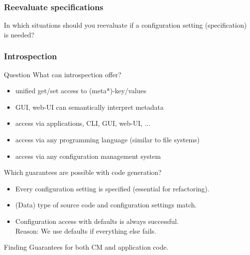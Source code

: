 \begin{frame}
	\frametitle{Reevaluate specifications}

	In which situations should you reevaluate if a configuration setting (specification) is needed?

	\pause

\end{frame}


\begin{frame}
	\frametitle{Introspection}
	\begin{alertblock}{Question}
	What can introspection offer?
	\end{alertblock}

	\pause

	\begin{itemize}
	\item unified get/set access to (meta*)-key/values
	\item GUI, web-UI can semantically interpret metadata
	\item access via applications, CLI, GUI, web-UI, ...
	\item access via any programming language (similar to file systems)
	\item access via any configuration management system
	\end{itemize}
\end{frame}

\breakframe

\begin{frame}
	Which guarantees are possible with code generation?

	\pause

	\begin{itemize}
	\item Every configuration setting is specified (essential for refactoring).
	\item (Data) type of source code and configuration settings match.
	\item Configuration access with defaults is always successful. \\
	Reason: We use defaults if everything else fails.
	\end{itemize}
	\vspace{3em}

	\begin{alertblock}{Finding}
	Guarantees for both CM and application code.
	\end{alertblock}
\end{frame}

